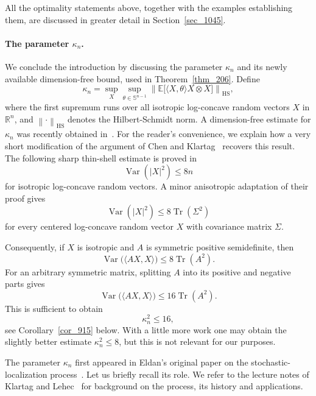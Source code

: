 \documentclass[12pt]{article}
\theoremstyle{definition}
\theoremstyle{remark}
\newcommand{\R}{\mathbb R}
\newcommand{\E}{\mathbb E}
\newcommand{\Var}{\operatorname{Var}}
\newcommand{\Tr}{\operatorname{Tr}}
\newcommand{\HS}{\mathrm{HS}}
\newcommand{\norm}[1]{\left\lVert #1\right\rVert}
\begin{document}
All the optimality statements above, together with the examples
establishing them, are discussed in greater detail in
Section~\ref{sec_1045}.

\paragraph{The parameter $\kappa_n$.}
We conclude the introduction by discussing the parameter $\kappa_n$
and its newly available dimension-free bound, used in
Theorem~\ref{thm_206}. Define
\begin{equation}\label{eq_381}
  \kappa_n
  =
  \sup_X\sup_{\theta\in\mathbb S^{n-1}}
  \norm{
    \E\bigl[\langle X,\theta\rangle X\otimes X\bigr]
  }_{\HS},
\end{equation}
where the first supremum runs over all isotropic log-concave random
vectors $X$ in $\R^n$, and $\norm{\cdot}_{\HS}$ denotes the
Hilbert-Schmidt norm. A dimension-free estimate for $\kappa_n$ was
recently obtained in~\cite{Letwin}. For the reader's convenience, we
explain how a very short modification of the argument of Chen and
Klartag~\cite{ChenKlartag} recovers this result. The following sharp thin-shell estimate is proved in \cite{ChenKlartag}
\[
  \Var(|X|^2)\leq8n
\]
for isotropic log-concave random vectors. A minor anisotropic
adaptation of their proof gives
\begin{equation}\label{eq_401}
  \Var(|X|^2)
  \leq
  8\Tr(\Sigma^2)
\end{equation}
for every centered log-concave random vector $X$ with covariance
matrix $\Sigma$.

Consequently, if $X$ is isotropic and $A$ is symmetric positive
semidefinite, then
\[
  \Var\bigl(\langle AX,X\rangle\bigr)
  \leq
  8\Tr(A^2).
\]
For an arbitrary symmetric matrix, splitting $A$ into its positive and
negative parts gives
\[
  \Var\bigl(\langle AX,X\rangle\bigr)
  \leq
  16\Tr(A^2).
\]
This is sufficient to obtain
\begin{equation}\label{eq_424}
  \kappa_n^2\leq16,
\end{equation}
see Corollary~\ref{cor_915} below. With a little more work one may
obtain the slightly better estimate $\kappa_n^2\leq8$, but this is not
relevant for our purposes.

The parameter $\kappa_n$ first appeared in Eldan's original paper on
the stochastic-localization process~\cite{Eldan}. Let us briefly
recall its role. We refer to the lecture notes of Klartag and
Lehec~\cite{KlartagLehecSurvey} for background on the process, its
history and applications.
\end{document}
